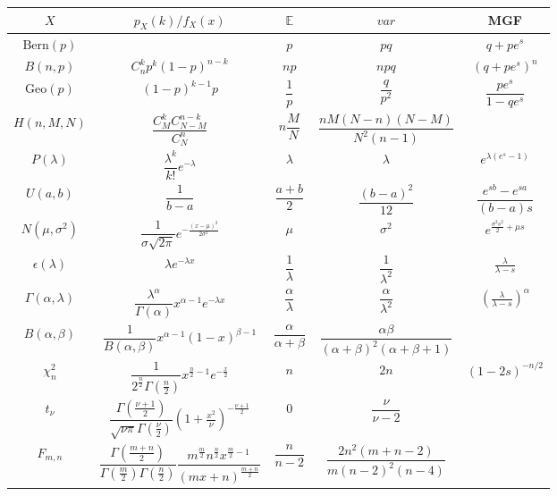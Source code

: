 \begin{table}[htbp]
    \centering
    \begin{tabular}{c|cccc}
        \hline
        $X$&$p_X(k)\big/f_X(x)$&$\quad \mathbb{E}\quad$&$var$&MGF\\
        \hline
        $\mathrm{Bern} (p)$& &$p$&$pq$&$q+pe^s$\\
        $B (n,p)$&$C_n^k p^k(1-p)^{n-k}$&$np$&$npq$&$(q+pe^s)^n$\\
        $\mathrm{Geo} (p)$&$(1-p)^{k-1}p$&$\dfrac{1}{p}$&$\dfrac{q}{p^2}$&$\dfrac{pe^s}{1-qe^s}$\\
        $H(n,M,N)$&$\dfrac{C_M^kC_{N-M}^{n-k}}{C_N^n}$&$n\dfrac{M}{N}$&$\dfrac{nM(N-n)(N-M)}{N^2(n-1)}$&\\
        $P(\lambda)$&$\dfrac{\lambda^k}{k!}e^{-\lambda}$&$\lambda$&$\lambda$&$e^{\lambda(e^s-1)}$\\
        $U(a,b)$&$\dfrac{1}{b-a}$&$\dfrac{a+b}{2}$&$\dfrac{(b-a)^2}{12}$&$\dfrac{e^{sb}-e^{sa}}{(b-a)s}$\\
        $N(\mu,\sigma^2)$&$\dfrac{1}{\sigma \sqrt{2\pi}}e^{-\frac{(x-\mu)^2}{2\sigma^2}}$&$\mu$&$\sigma^2$&$e^{\frac{\sigma^2s^2}{2}+\mu s}$\\
        $\epsilon(\lambda)$&$\lambda e^{-\lambda x}$&$\dfrac{1}{\lambda}$&$\dfrac{1}{\lambda^2}$&$\frac{\lambda}{\lambda-s}$\\
        $\Gamma(\alpha,\lambda)$&$\dfrac{\lambda^\alpha}{\Gamma(\alpha)}x^{\alpha-1}e^{-\lambda x}$&$\dfrac{\alpha}{\lambda}$&$\dfrac{\alpha}{\lambda^2}$&$\left(\frac{\lambda}{\lambda-s}\right)^\alpha $\\
        $B(\alpha,\beta)$&$\dfrac{1}{B(\alpha,\beta)}x^{\alpha-1}(1-x)^{\beta-1}$&$\dfrac{\alpha}{\alpha+\beta}$&$\dfrac{\alpha\beta}{(\alpha+\beta)^2(\alpha+\beta+1)}$&\\
        $\chi^2_n$&$\dfrac{1}{2^{\frac{n}{2}}\Gamma(\frac{n}{2})}x^{\frac{n}{2}-1}e^{-\frac{x}{2}}$&$n$&$2n$&$ (1-2s)^{-n/2} $\\
        $t_\nu$&$\dfrac{\Gamma(\frac{\nu+1}{2})}{\sqrt{\nu\pi}\Gamma(\frac{\nu}{2})}(1+\frac{x^2}{\nu})^{-\frac{\nu+1}{2}}$&$0$&$\dfrac{\nu}{\nu-2}$&\\
        $F_{m,n}$&$\dfrac{\Gamma(\frac{m+n}{2})}{\Gamma(\frac{m}{2})\Gamma(\frac{n}{2})}\dfrac{m^\frac{m}{2}n^\frac{n}{2}x^{\frac{m}{2}-1}}{(mx+n)^{\frac{m+n}{2}}}$&$\dfrac{n}{n-2}$&$\dfrac{2n^2(m+n-2)}{m(n-2)^2(n-4)}$&\\
        \hline
    \end{tabular}
\end{table}

